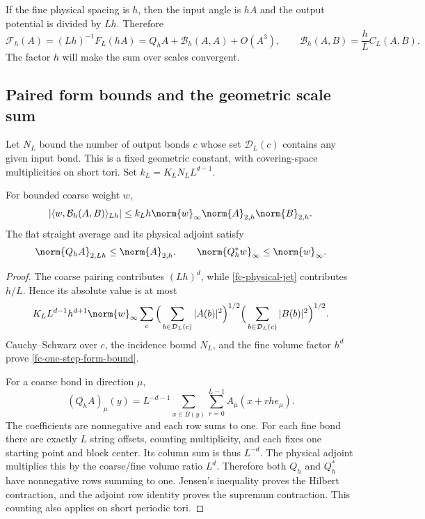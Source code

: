If the fine physical spacing is $h$, then the input angle is $hA$
and the output potential is divided by $Lh$. Therefore
\begin{equation}
 \mathcal F_h(A)=(Lh)^{-1}F_L(hA)
    =Q_hA+\mathcal B_h(A,A)+O(A^3),
 \qquad \mathcal B_h(A,B)=\frac hL C_L(A,B).
 \label{fc-physical-jet}
\end{equation}
The factor $h$ will make the sum over scales convergent.

\subsection{Paired form bounds and the geometric scale sum}
\label{fc-geometric-section}

Let $N_L$ bound the number of output bonds $c$ whose set
$\mathcal D_L(c)$ contains any given input bond. This is a fixed
geometric constant, with covering-space multiplicities on short
tori. Set $k_L=K_LN_LL^{d-1}$.

\begin{lemma}
\label{fc-one-step-form}
For bounded coarse weight $w$,
\begin{equation}
 |\langle w,\mathcal B_h(A,B)\rangle_{Lh}|
 \le k_Lh\norm{w}_\infty\norm{A}_{2,h}\norm{B}_{2,h}.
 \label{fc-one-step-form-bound}
\end{equation}
The flat straight average and its physical adjoint satisfy
\begin{equation}
 \norm{Q_hA}_{2,Lh}\le\norm{A}_{2,h},\qquad
 \norm{Q_h^*w}_\infty\le\norm{w}_\infty.
 \label{fc-contractions}
\end{equation}
\end{lemma}

\begin{proof}
The coarse pairing contributes $(Lh)^d$, while
\eqref{fc-physical-jet} contributes $h/L$. Hence its absolute value
is at most
\[
 K_LL^{d-1}h^{d+1}\norm{w}_\infty
 \sum_c
 \Big(\sum_{b\in\mathcal D_L(c)}|A(b)|^2\Big)^{1/2}
 \Big(\sum_{b\in\mathcal D_L(c)}|B(b)|^2\Big)^{1/2}.
\]
Cauchy--Schwarz over $c$, the incidence bound $N_L$, and the fine
volume factor $h^d$ prove \eqref{fc-one-step-form-bound}.

For a coarse bond in direction $\mu$,
\[
 (Q_h A)_\mu(y)=L^{-d-1}\sum_{x\in B(y)}\sum_{r=0}^{L-1}
                         A_\mu(x+rh e_\mu).
\]
The coefficients are nonnegative and each row sums to one. For
each fine bond there are exactly $L$ string offsets, counting
multiplicity, and each fixes one starting point and block center.
Its column sum is thus $L^{-d}$. The physical adjoint multiplies
this by the coarse/fine volume ratio $L^d$. Therefore both $Q_h$
and $Q_h^*$ have nonnegative rows summing to one. Jensen's
inequality proves the Hilbert contraction, and the adjoint row
identity proves the supremum contraction. This counting also
applies on short periodic tori.
\end{proof}

